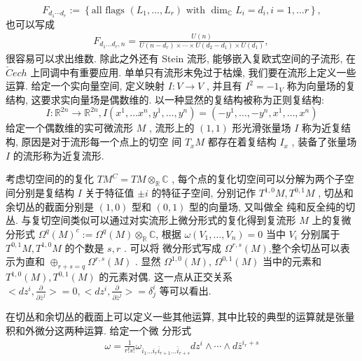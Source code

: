 \documentclass[UTF8,AutoFakeBold,scheme=chinese,eversion]{GXMU-Thesis}
\begin{document}
\[F_{d_1 \cdots d_r}:=\left\{ \text{all flags }\left(L_1, \ldots, L_r\right)\text{ with }\operatorname{dim}_{\mathbb{C}} L_i=d_i, i=1, \ldots r\right\},\]
也可以写成
\begin{align*}
F_{d_1 \ldots d_r, n}=\frac{U(n)}{U\left(n-d_r\right) \times \cdots \times U\left(d_2-d_1\right) \times U\left(d_1\right)} \text {, }
\end{align*}
很容易可以求出维数. 除此之外还有 Stein 流形, 能够嵌入复欧式空间的子流形, 在 $\check{C} e c h$ 上同调中有重要应用. 
单单只有流形末免过于枯燥, 我们要在流形上定义一些运算. 给定一个实向量空间, 定义映射 $I: V \rightarrow V$ , 并且有 $I^2=-1_V$ 称为向量场的复结构, 这要求实向量场是偶数维的. 以一种显然的复结构被称为正则复结构:
\[I: \mathbb{R}^{2 n} \rightarrow \mathbb{R}^{2 n}, I\left(x^1, \ldots x^n, y^1, \ldots, y^n\right)=\left(-y^1, \ldots,-y^n, x^1, \ldots, x^n\right)\]
给定一个偶数维的实可微流形 $M$ , 流形上的 $(1,1)$ 形光滑张量场 $I$ 称为近复结构, 原因是对于流形每一个点上的切空 间 $T_x M$ 都存在着复结构 $I_x$ , 装备了张量场 $I$ 的流形称为近复流形. 

考虑切空间的的复化 $T M^C=T M \otimes_{\mathbb{R}} \mathbb{C}$ , 每个点的复化切空间可以分解为两个子空间分别是复结构 $I$ 关于特征值 $\pm i$ 的特征子空间, 分别记作 $T^{1,0} M, T^{0,1} M$ , 切丛和余切丛的截面分别是 $(1,0)$ 型和 $(0,1)$ 型的向量场, 又叫做全 纯和反全纯的切丛. 与复切空间类似可以通过对实流形上微分形式的复化得到复流形 $M$ 上的复微分形式
$\Omega^q(M)^c:=\Omega^q(M) \otimes_{\mathbb{R}} \mathbb{C}$, 根据 $\omega\left(V_1, \ldots, V_n\right)=0$ 当中 $V_i$ 分别属于 $T^{0,1} M, T^{1,0} M$ 的个数是 $s, r$ . 可以将 微分形式写成 $\Omega^{r, s}(M)$,整个余切丛可以表示为直和 $\oplus_{r+s=q} \Omega^{r, s}(M)$ . 显然 $\Omega^{1,0}(M)$, $\Omega^{0,1}(M)$ 当中的元素和 $T^{1,0}(M), T^{0,1}(M)$ 的元素对偶. 这一点从正交关系 $<d z^i, \frac{\partial}{\partial \bar{z}^j}>=0,<d z^i, \frac{\partial}{\partial \bar{z}^j}>=\delta_j^i$ 等可以看出. 

在切丛和余切丛的截面上可以定义一些其他运算, 其中比较的典型的运算就是张量积和外微分这两种运算. 给定一个微 分形式
\begin{align*}
\omega=\frac{1}{r ! s !} \omega_{i_1 \ldots i_r \bar{i}_{r+1} \ldots \bar{i}_{r+s}} d z^i \wedge \cdots \wedge d \bar{z}^{i_r+s}
\end{align*}
\end{document}
